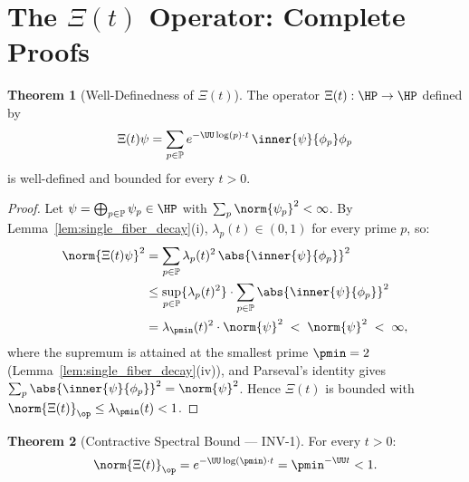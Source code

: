 \documentclass[12pt,letterpaper]{article}
\theoremstyle{definition}
\newtheorem{theorem}{Theorem}[section]
\theoremstyle{remark}
\begin{document}
\section{The $\Xi(t)$ Operator: Complete Proofs}
\label{sec:xi_proofs}

\begin{theorem}[Well-Definedness of $\Xi(t)$]
\label{thm:well_defined}
The operator $\Xi(t): \HP \to \HP$ defined by
\begin{equation}
  \Xi(t)\psi
  = \sum_{p\in\mathbb{P}} e^{-\UU\log(p)\cdot t}\,
    \inner{\psi}{\phi_p}\phi_p
  \label{eq:xi_def}
\end{equation}
is well-defined and bounded for every $t > 0$.
\end{theorem}

\begin{proof}
Let $\psi = \bigoplus_{p\in\mathbb{P}}\psi_p \in \HP$ with
$\sum_{p}\norm{\psi_p}^2 < \infty$.
By Lemma~\ref{lem:single_fiber_decay}(i), $\lambda_p(t) \in (0,1)$
for every prime $p$, so:
\begin{align*}
  \norm{\Xi(t)\psi}^2
  &= \sum_{p\in\mathbb{P}} \lambda_p(t)^2\,\abs{\inner{\psi}{\phi_p}}^2 \\
  &\leq \sup_{p\in\mathbb{P}}\{\lambda_p(t)^2\} \cdot
    \sum_{p\in\mathbb{P}} \abs{\inner{\psi}{\phi_p}}^2 \\
  &= \lambda_{\pmin}(t)^2 \cdot \norm{\psi}^2 \;<\; \norm{\psi}^2 \;<\;\infty,
\end{align*}
where the supremum is attained at the smallest prime $\pmin = 2$
(Lemma~\ref{lem:single_fiber_decay}(iv)), and Parseval's identity gives
$\sum_p \abs{\inner{\psi}{\phi_p}}^2 = \norm{\psi}^2$.
Hence $\Xi(t)$ is bounded with $\norm{\Xi(t)}_\op \leq \lambda_{\pmin}(t) < 1$.
\end{proof}

\begin{theorem}[Contractive Spectral Bound --- INV-1]
\label{thm:contractivity}
For every $t > 0$:
\begin{equation}
  \norm{\Xi(t)}_\op
  = e^{-\UU\log(\pmin)\cdot t}
  = \pmin^{-\UU t}
  < 1.
  \label{eq:op_norm}
\end{equation}
\end{theorem}
\end{document}
